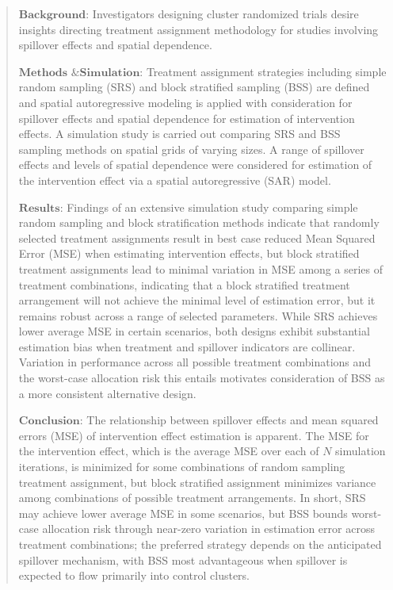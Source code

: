 \documentclass{article}[11pt]
\begin{document}
\begin{abstract}
   $\textbf{Background}$: Investigators designing cluster randomized trials desire insights directing treatment assignment methodology for studies involving spillover effects and spatial dependence.

   $\textbf{Methods \& Simulation}$: Treatment assignment strategies including simple random sampling (SRS) and block stratified sampling (BSS) are defined and spatial autoregressive modeling is applied with consideration for spillover effects and spatial dependence for estimation of intervention effects. A simulation study is carried out comparing SRS and BSS sampling methods on spatial grids of varying sizes. A range of spillover effects and levels of spatial dependence were considered for estimation of the intervention effect via a spatial autoregressive (SAR) model.


   $\textbf{Results}$: Findings of an extensive simulation study comparing simple random sampling and block stratification methods indicate that randomly selected treatment assignments result in best case reduced Mean Squared Error (MSE) when estimating intervention effects, but block stratified treatment assignments lead to minimal variation in MSE among a series of treatment combinations, indicating that a block stratified treatment arrangement will not achieve the minimal level of estimation error, but it remains robust across a range of selected parameters. While SRS achieves lower average MSE in certain scenarios, both designs exhibit substantial estimation bias when treatment and spillover indicators are collinear. Variation in performance across all possible treatment combinations and the worst-case allocation risk this entails motivates consideration of BSS as a more consistent alternative design.


   $\textbf{Conclusion}$: The relationship between spillover effects and mean squared errors (MSE) of intervention effect estimation is apparent. The MSE for the intervention effect, which is the average MSE over each of $N$ simulation iterations, is minimized for some combinations of random sampling treatment assignment, but block stratified assignment minimizes variance among combinations of possible treatment arrangements. In short, SRS may achieve lower average MSE in some scenarios, but BSS bounds worst-case allocation risk through near-zero variation in estimation error across treatment combinations; the preferred strategy depends on the anticipated spillover mechanism, with BSS most advantageous when spillover is expected to flow primarily into control clusters.
\end{abstract}
\end{document}
